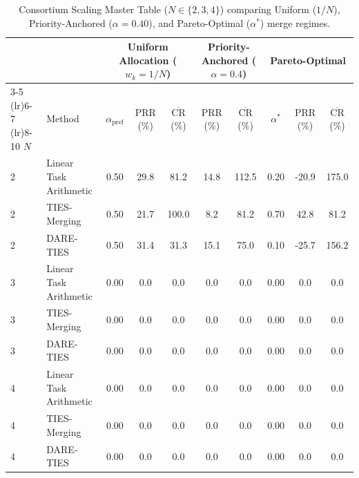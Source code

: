 \begin{table}[t]
\centering
\small
\caption{Consortium Scaling Master Table ($N \in \{2, 3, 4\}$) comparing Uniform ($1/N$), Priority-Anchored ($\alpha=0.40$), and Pareto-Optimal ($\alpha^*$) merge regimes.}
\label{tab:consortium_scaling}
\begin{tabular}{llcccccccc}
\toprule
& & \multicolumn{3}{c}{\textbf{Uniform Allocation ($w_k=1/N$)}} & \multicolumn{2}{c}{\textbf{Priority-Anchored ($\alpha=0.4$)}} & \multicolumn{3}{c}{\textbf{Pareto-Optimal}} \\
\cmidrule(lr){3-5} \cmidrule(lr){6-7} \cmidrule(lr){8-10}
$N$ & Method & $\alpha_{\text{pref}}$ & PRR (\%) & $\overline{\text{CR}}$ (\%) & PRR (\%) & $\overline{\text{CR}}$ (\%) & $\alpha^*$ & PRR (\%) & $\overline{\text{CR}}$ (\%) \\
\midrule
2 & Linear Task Arithmetic & 0.50 & 29.8 & 81.2 & 14.8 & 112.5 & 0.20 & -20.9 & 175.0 \\
2 & TIES-Merging & 0.50 & 21.7 & 100.0 & 8.2 & 81.2 & 0.70 & 42.8 & 81.2 \\
2 & DARE-TIES & 0.50 & 31.4 & 31.3 & 15.1 & 75.0 & 0.10 & -25.7 & 156.2 \\
3 & Linear Task Arithmetic & 0.00 & 0.0 & 0.0 & 0.0 & 0.0 & 0.00 & 0.0 & 0.0 \\
3 & TIES-Merging & 0.00 & 0.0 & 0.0 & 0.0 & 0.0 & 0.00 & 0.0 & 0.0 \\
3 & DARE-TIES & 0.00 & 0.0 & 0.0 & 0.0 & 0.0 & 0.00 & 0.0 & 0.0 \\
4 & Linear Task Arithmetic & 0.00 & 0.0 & 0.0 & 0.0 & 0.0 & 0.00 & 0.0 & 0.0 \\
4 & TIES-Merging & 0.00 & 0.0 & 0.0 & 0.0 & 0.0 & 0.00 & 0.0 & 0.0 \\
4 & DARE-TIES & 0.00 & 0.0 & 0.0 & 0.0 & 0.0 & 0.00 & 0.0 & 0.0 \\
\bottomrule
\end{tabular}
\end{table}